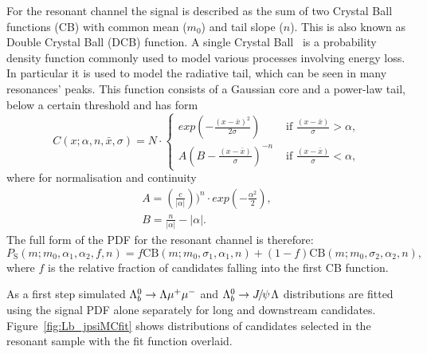 For the resonant channel the signal is described as the sum of two Crystal Ball functions (CB) with
common mean ($m_0$) and tail slope ($n$). This is also known as Double Crystal Ball (DCB) function.
A single Crystal Ball~\cite{Skwarnicki:1986xj} is a probability
density function commonly used to model various processes involving energy loss. In particular it is used
to model the radiative tail, which can be seen in many resonances' peaks. This function 
consists of a Gaussian core and a power-law tail, below a certain threshold and has form
%
\begin{equation}
C(x;\alpha,n,\bar{x},\sigma) = N \cdot
\begin{cases}
exp \left( -\frac{(x - \bar{x})^2}{2\sigma} \right)  & \mbox{   if   } \frac{(x - \bar{x})}{\sigma} > \alpha, \\
A\left( B - \frac{(x - \bar{x})}{\sigma} \right)^{-n} & \mbox{   if   } \frac{(x - \bar{x})}{\sigma} < \alpha,
\end{cases}
\end{equation}
%
where for normalisation and continuity
%
\begin{equation}
\label{CB}
\begin{array}{ll}
A = \left( \frac{c}{|\alpha|} \right))^n \cdot exp(- \frac{\alpha^2}{2}), \\
B = \frac{n}{|\alpha|} - |\alpha|.
\end{array}
\end{equation}
%
The full form of the PDF for the resonant channel is therefore:
%
\begin{equation}
P_\mathrm{S}(m;m_0,\alpha_1,\alpha_2,f,n) = f \text{CB}(m;m_0,\sigma_1,\alpha_1,n)+(1-f)\text{CB}(m;m_0,\sigma_2,\alpha_2,n),
\end{equation}
%
where $f$ is the relative fraction of candidates falling into the first CB function.

As a first step simulated $\Lambda^0_b\rightarrow\Lambda\mu^+\mu^-$ and $\Lb\to\jpsi\Lz$ distributions are fitted using the signal PDF alone
separately for long and downstream candidates. Figure~\ref{fig:Lb_jpsiMCfit} shows distributions
of candidates selected in the resonant sample with the fit function overlaid.

